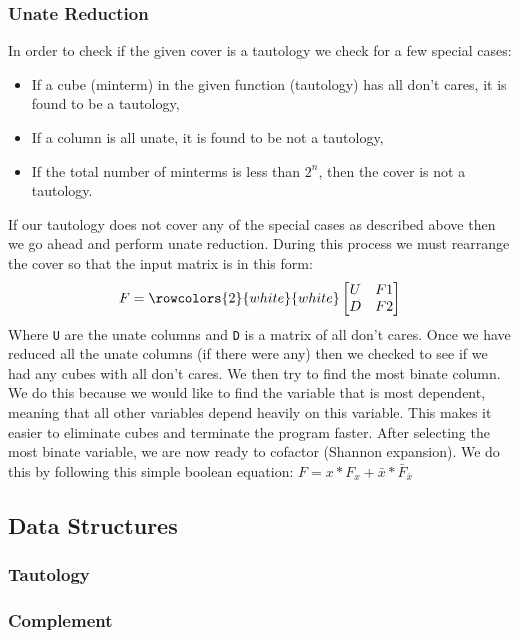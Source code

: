\documentclass[10pt]{article}
\begin{document}
        \subsubsection{Unate Reduction}
        In order to check if the given cover is a tautology we check for a few
        special cases:
        \begin{itemize}
            \item If a cube (minterm) in the given function (tautology) has all
                  don't cares, it is found to be a tautology,
            \item If a column is all unate, it is found to be not a tautology,
            \item If the total number of minterms is less than $2^{n}$, then the
                  cover is not a tautology.
        \end{itemize}
        If our tautology does not cover any of the special cases as described
        above then we go ahead and perform unate reduction. During this process
        we must rearrange the cover so that the input matrix is in this form:
        $$
        F =
        \rowcolors{2}{white}{white}
        \begin{bmatrix}
            U & F1  \\
            D & F2
        \end{bmatrix}
        $$
        Where \texttt{U} are the unate columns and \texttt{D} is a matrix of
        all don't cares. Once we have reduced all the unate columns (if there
        were any) then we checked to see if we had any cubes with all don't
        cares. We then try to find the most binate column. We do this because
        we would like to find the variable that is most dependent, meaning that
        all other variables depend heavily on this variable. This makes it
        easier to eliminate cubes and terminate the program faster. After
        selecting the most binate variable, we are now ready to cofactor
        (Shannon expansion). We do this by following this simple boolean
        equation: $ F = x*F_{x} + \bar{x}*\bar{F}_{\bar{x}} $

    \subsection{Data Structures}
        \subsubsection{Tautology}
        \subsubsection{Complement}
\end{document}
